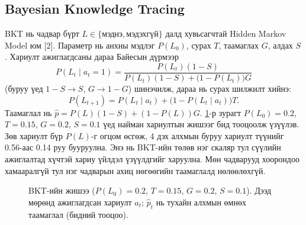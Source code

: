 \documentclass[10pt,twocolumn]{article}
\begin{document}
\subsection{Bayesian Knowledge Tracing}
BKT нь чадвар бүрт $L\in\{\text{мэднэ},\text{мэдэхгүй}\}$ далд хувьсагчтай Hidden Markov
Model юм [2]. Параметр нь анхны мэдлэг $P(L_0)$, сурах $T$, таамаглах $G$, алдах $S$.
Хариулт ажиглагдсаны дараа Байесын дүрмээр
\begin{equation}
P(L_t\mid a_t{=}1)=\frac{P(L_t)(1-S)}{P(L_t)(1-S)+\bigl(1-P(L_t)\bigr)G}
\end{equation}
(буруу үед $1-S\to S$, $G\to 1-G$) шинэчилж, дараа нь сурах шилжилт хийнэ:
\begin{equation}
P(L_{t+1})=P(L_t\mid a_t)+\bigl(1-P(L_t\mid a_t)\bigr)T.
\end{equation}
Таамаглал нь $\hat p=P(L)(1-S)+(1-P(L))G$. \ref{fig:bkt}-р зурагт $P(L_0)=0.2$, $T=0.15$, $G=0.2$,
$S=0.1$ үед найман хариултын жишээг бид тооцоолж үзүүлэв. Зөв хариулт бүр $P(L)$-г огцом
өсгөж, 4 дэх алхмын буруу хариулт түүнийг 0.56-аас 0.14 руу бууруулна. Энэ нь BKT-ийн төлөв нэг
скаляр тул сүүлийн ажиглалтад хүчтэй хариу үйлдэл үзүүлдгийг харуулна. Мөн чадварууд
хоорондоо хамааралгүй тул нэг чадварын ахиц нөгөөгийн таамаглалд нөлөөлөхгүй.

\begin{figure}[t]
\centering
{}
\caption{BKT-ийн жишээ ($P(L_0)=0.2$, $T=0.15$, $G=0.2$, $S=0.1$). Дээд мөрөнд
ажиглагдсан хариулт $a_t$; $\hat p_t$ нь тухайн алхмын өмнөх таамаглал (бидний тооцоо).}
\label{fig:bkt}
\end{figure}
\end{document}
